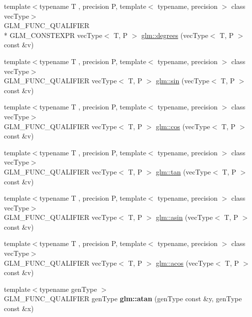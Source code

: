 \begin{DoxyCompactItemize}
\item 
{\footnotesize template$<$typename T , precision P, template$<$ typename, precision $>$ class vec\-Type$>$ }\\G\-L\-M\-\_\-\-F\-U\-N\-C\-\_\-\-Q\-U\-A\-L\-I\-F\-I\-E\-R \\*
G\-L\-M\-\_\-\-C\-O\-N\-S\-T\-E\-X\-P\-R vec\-Type$<$ T, P $>$ \hyperlink{group__core__func__trigonometric_gabccdcc282134fd62af0ff3d6e4bb21f1}{glm\-::degrees} (vec\-Type$<$ T, P $>$ const \&v)
\item 
{\footnotesize template$<$typename T , precision P, template$<$ typename, precision $>$ class vec\-Type$>$ }\\G\-L\-M\-\_\-\-F\-U\-N\-C\-\_\-\-Q\-U\-A\-L\-I\-F\-I\-E\-R vec\-Type$<$ T, P $>$ \hyperlink{group__core__func__trigonometric_ga4a0ddceb6b1e64ce0e4da209dcb021d5}{glm\-::sin} (vec\-Type$<$ T, P $>$ const \&v)
\item 
{\footnotesize template$<$typename T , precision P, template$<$ typename, precision $>$ class vec\-Type$>$ }\\G\-L\-M\-\_\-\-F\-U\-N\-C\-\_\-\-Q\-U\-A\-L\-I\-F\-I\-E\-R vec\-Type$<$ T, P $>$ \hyperlink{group__core__func__trigonometric_ga728fd86f14609e37d83f82429995b7b3}{glm\-::cos} (vec\-Type$<$ T, P $>$ const \&v)
\item 
{\footnotesize template$<$typename T , precision P, template$<$ typename, precision $>$ class vec\-Type$>$ }\\G\-L\-M\-\_\-\-F\-U\-N\-C\-\_\-\-Q\-U\-A\-L\-I\-F\-I\-E\-R vec\-Type$<$ T, P $>$ \hyperlink{group__core__func__trigonometric_gab3ae890c38b7d3aa4d5e00998fd296b2}{glm\-::tan} (vec\-Type$<$ T, P $>$ const \&v)
\item 
{\footnotesize template$<$typename T , precision P, template$<$ typename, precision $>$ class vec\-Type$>$ }\\G\-L\-M\-\_\-\-F\-U\-N\-C\-\_\-\-Q\-U\-A\-L\-I\-F\-I\-E\-R vec\-Type$<$ T, P $>$ \hyperlink{group__core__func__trigonometric_ga88e29b8289e882859d76a25798dd9490}{glm\-::asin} (vec\-Type$<$ T, P $>$ const \&v)
\item 
{\footnotesize template$<$typename T , precision P, template$<$ typename, precision $>$ class vec\-Type$>$ }\\G\-L\-M\-\_\-\-F\-U\-N\-C\-\_\-\-Q\-U\-A\-L\-I\-F\-I\-E\-R vec\-Type$<$ T, P $>$ \hyperlink{group__core__func__trigonometric_ga58ad259b788528fe0a4bd2eeb5e381cc}{glm\-::acos} (vec\-Type$<$ T, P $>$ const \&v)
\item 
\hypertarget{namespaceglm_a6207cc9d98e3e5961d789e70ad3f32c8}{{\footnotesize template$<$typename gen\-Type $>$ }\\G\-L\-M\-\_\-\-F\-U\-N\-C\-\_\-\-Q\-U\-A\-L\-I\-F\-I\-E\-R gen\-Type {\bfseries glm\-::atan} (gen\-Type const \&y, gen\-Type const \&x)}\label{namespaceglm_a6207cc9d98e3e5961d789e70ad3f32c8}


\end{DoxyCompactItemize}
